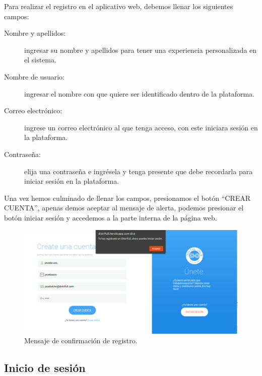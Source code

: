 Para realizar el registro en el aplicativo web, debemos llenar los siguientes campos: 
\begin{description}
	\item[Nombre y apellidos:] ingresar su nombre y apellidos para tener una experiencia personalizada en el sistema.
	\item[Nombre de usuario:] ingresar el nombre con que quiere ser identificado dentro de la plataforma.
	\item[Correo electr\'onico:] ingrese un correo electr\'onico al que tenga acceso, con este iniciara sesi\'on en la plataforma.
	\item[Contrase\~na:] elija una contrase\~na e ingr\'esela y tenga presente que debe recordarla para iniciar sesi\'on en la plataforma.
\end{description}
Una vez hemos culminado de llenar los campos, presionamos el bot\'on ``\textcolor{bluedistri}{CREAR CUENTA}'', apenas demos aceptar al mensaje de alerta, podemos presionar el bot\'on \textcolor{orangedistri}{iniciar sesi\'on} y accedemos a la parte interna de la p\'agina web.
\begin{figure}[h!]
	\centering
	\includegraphics[width=1\linewidth, height=0.4\textheight]{imagenes/mensajeDeRegistro}
	\caption[Mensaje de registro.]{Mensaje de confirmaci\'on de registro.}
	\label{fig:mensajederegistro}
\end{figure}

\subsection{Inicio de sesi\'on}


